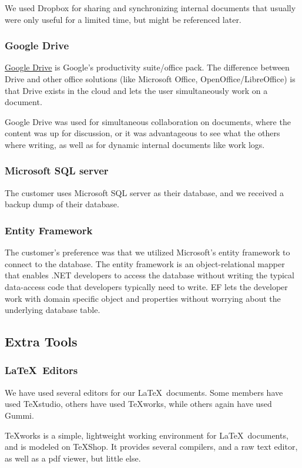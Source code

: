 We used Dropbox for sharing and synchronizing internal documents that usually were only useful for a limited time, but might be referenced later.

\subsubsection{Google Drive}
\href{https://drive.google.com/}{Google Drive} is Google's productivity suite/office pack. The difference between Drive and other office solutions (like Microsoft Office, OpenOffice/LibreOffice) is that Drive exists in the cloud and lets the user simultaneously work on a document.

Google Drive was used for simultaneous collaboration on documents, where the content was up for discussion, or it was advantageous to see what the others where writing, as well as for dynamic internal documents like work logs.

\subsubsection{Microsoft SQL server}
The customer uses Microsoft SQL server as their database, and we received a backup dump of their database. %

\subsubsection{Entity Framework}
The customer's preference was that we utilized Microsoft's entity framework to connect to the database. The entity framework is an object-relational mapper that enables .NET developers to access the database without writing the typical data-access code that developers typically need to write. EF lets the developer work with domain specific object and properties without worrying about the underlying database table.

\subsection{Extra Tools}
\subsubsection{\LaTeX \ Editors}%
We have used several editors for our \LaTeX \ documents. Some members have used TeXstudio, others have used TeXworks, while others again have used Gummi.

TeXworks is a simple, lightweight working environment for \LaTeX \ documents, and is modeled on TeXShop. It provides several compilers, and a raw text editor, as well as a pdf viewer, but little else.

